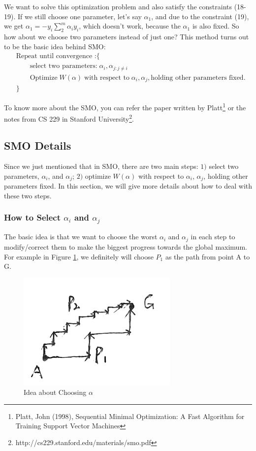 \documentclass[a4paper]{article}
\begin{document}
We want to solve this optimization problem and also satisfy the constraints (18-19). If we still choose one parameter, let's say $\alpha_1$, and due to the constraint (19), we get $\alpha_1 = - y_i \sum_{2}^{m} \alpha_i y_i$, which doesn't work, because the $\alpha_1$ is also fixed. So how about we choose two parameters instead of just one? This method turns out to be the basic idea behind SMO:
\begin{align*}
	&\text{Repeat until convergence :} \{ \\
	& \quad \quad \text{select two parameters:}\; \alpha_i, \alpha_{j: j \ne i} \\
	& \quad \quad \text{Optimize} \; W(\alpha) \; \text{with respect to} \; \alpha_i, \alpha_j, \text{holding other parameters fixed.} \\
	&\}
\end{align*}

To know more about the SMO, you can refer the paper written by Platt\footnote{Platt, John (1998), Sequential Minimal Optimization: A Fast Algorithm for Training Support Vector Machines} or the notes from CS 229 in Stanford University\footnote{http://cs229.stanford.edu/materials/smo.pdf}. 

\subsection{SMO Details}
Since we just mentioned that in SMO, there are two main steps: $1)$ select two parameters, $\alpha_i$, and $\alpha_j$; $2)$ optimize $W(\alpha)$ with respect to $\alpha_i$, $\alpha_j$, holding other parameters fixed. In this section, we will give more details about how to deal with these two steps.

\subsubsection{How to Select $\alpha_i$ and $\alpha_j$}
The basic idea is that we want to choose the worst $\alpha_i$ and $\alpha_j$ in each step to modify/correct them to make the biggest progress towards the global maximum. For example in Figure \ref{fig:ex1}, we definitely will choose $P_1$ as the path from point A to G.
\begin{figure}[h!]
  \centering
    \includegraphics[width=0.7\textwidth]{./images/ex1}
  \caption{Idea about Choosing $\alpha$}\label{fig:ex1}
\end{figure}
\end{document}
